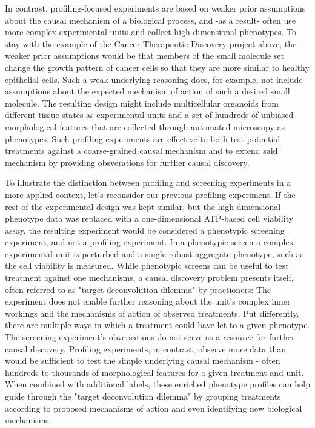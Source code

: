 \begin{flushleft}
In contrast, profiling-focused experiments are based on weaker prior assumptions about the causal mechanism of a biological process, and -as a result- often use more complex experimental units and collect high-dimensional phenotypes. To stay with the example of the Cancer Therapeutic Discovery project above, the weaker prior assumptions would be that members of the small molecule set change the growth pattern of cancer cells so that they are more similar to healthy epithelial cells. Such a weak underlying reasoning does, for example, not include assumptions about the expected mechanism of action of such a desired small molecule. The resulting design might include multicellular organoids from different tissue states as experimental units and a set of hundreds of unbiased morphological features that are collected through automated microscopy as phenotypes. Such profiling experiments are effective to both test potential treatments against a coarse-grained causal mechanism and to extend said mechanism by providing obsverations for further causal discovery. 

To illustrate the distinction between profiling and screening experiments in a more applied context, let's reconsider our previous profiling experiment. If the rest of the experimental design was kept similar, but the high dimensional phenotype data was replaced with a one-dimensional ATP-based cell viability assay, the resulting experiment would be considered a phenotypic screening experiment, and not a profiling experiment. In a phenotypic screen a complex experimental unit is perturbed and a single robust aggregate phenotype, such as the cell viability is measured. While phenotypic screens can be useful to test treatment against one mechanisms, a causal discovery problem presents itself, often referred to as "target deconvolution dilemma" by practioners: The experiment does not enable further reasoning about the unit's complex inner workings and the mechanisms of action of observed treatments. Put differently, there are multiple ways in which a treatment could have let to a given phenotype. The screening experiment's obversations do not serve as a resource for further causal discovery. Profiling experiments, in contrast, observe more data than would be sufficient to test the simple underlying causal mechanism - often hundreds to thousands of morphological features for a given treatment and unit. When combined with additional labels, these enriched phenotype profiles can help guide through the "target deconvolution dilemma" by grouping treatments according to proposed mechanisms of action and even identifying new biological mechanisms.


\end{flushleft}

